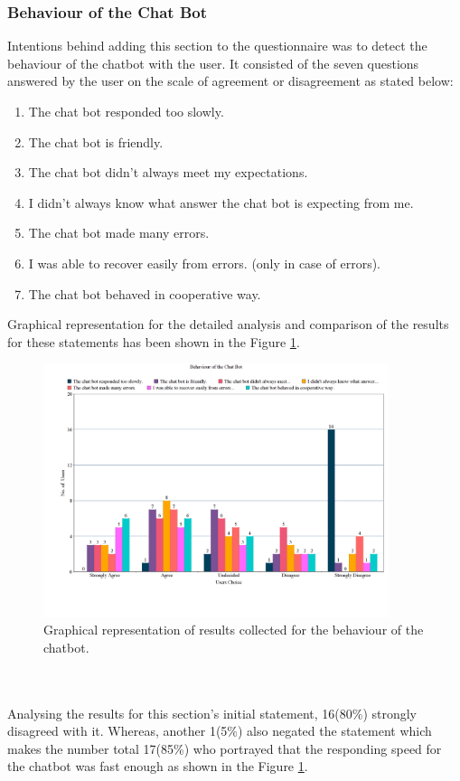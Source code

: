 \subsubsection*{Behaviour of the Chat Bot}
Intentions behind adding this section to the questionnaire was to detect the behaviour of the chatbot with the user. It consisted of the seven questions answered by the user on the scale of agreement or disagreement as stated below: 
\begin{enumerate}
    \item The chat bot responded too slowly.
    \item The chat bot is friendly.
    \item The chat bot didn't always meet my expectations.
    \item I didn't always know what answer the chat bot is expecting from me.
    \item The chat bot made many errors.
    \item I was able to recover easily from errors. (only in case of errors).
    \item The chat bot behaved in cooperative way.
\end{enumerate}
Graphical representation for the detailed analysis and comparison of the results for these statements has been shown in the Figure \ref{fig:behavofBot}.

\begin{figure}[!h]
    \centering
    \includegraphics[width=0.9\textwidth]{img/Behaviour_of_the_Chat_Bot_Updated.png}
    \caption{Graphical representation of results collected for the behaviour of the chatbot.}
    \label{fig:behavofBot}
\end{figure}
\\~\\
Analysing the results for this section's initial statement, 16(80\%) strongly disagreed with it. Whereas, another 1(5\%) also negated the statement which makes the number total 17(85\%) who portrayed that the responding speed for the chatbot was fast enough as shown in the Figure \ref{fig:behavofBot}. 

